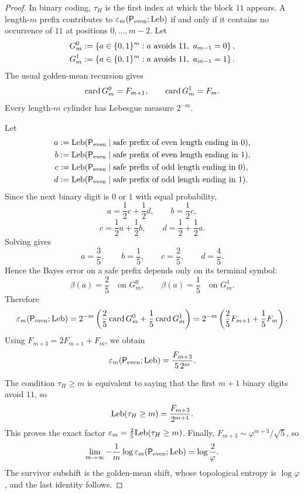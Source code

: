 \begin{proof}
In binary coding, \(\tau_H\) is the first index at which the block
\(11\) appears.  A length-\(m\) prefix contributes to
\(\varepsilon_m(\mathsf{P}_{\mathrm{even}};\mathrm{Leb})\) if and only if it
contains no occurrence of \(11\) at positions \(0,\ldots,m-2\).  Let
\begin{align*}
  G_m^0
  &:= \left\{a\in\{0,1\}^m:
           a \text{ avoids }11,\ a_{m-1}=0\right\}, \\
  G_m^1
  &:= \left\{a\in\{0,1\}^m:
           a \text{ avoids }11,\ a_{m-1}=1\right\}.
\end{align*}
The usual golden-mean recursion gives
\[
  \operatorname{card}{G_m^0}=F_{m+1},
  \qquad
  \operatorname{card}{G_m^1}=F_m.
\]
Every length-\(m\) cylinder has Lebesgue measure \(2^{-m}\).

Let
\begin{align*}
  a
  &:= \mathrm{Leb}(\mathsf{P}_{\mathrm{even}}
           \mid \text{safe prefix of even length ending in }0), \\
  b
  &:= \mathrm{Leb}(\mathsf{P}_{\mathrm{even}}
           \mid \text{safe prefix of even length ending in }1), \\
  c
  &:= \mathrm{Leb}(\mathsf{P}_{\mathrm{even}}
           \mid \text{safe prefix of odd length ending in }0), \\
  d
  &:= \mathrm{Leb}(\mathsf{P}_{\mathrm{even}}
           \mid \text{safe prefix of odd length ending in }1).
\end{align*}
Since the next binary digit is \(0\) or \(1\) with equal probability,
\[
  a=\frac12 c+\frac12 d,
  \qquad
  b=\frac12 c,
\]
\[
  c=\frac12 a+\frac12 b,
  \qquad
  d=\frac12+\frac12 a.
\]
Solving gives
\[
  a=\frac35,\qquad b=\frac15,\qquad c=\frac25,\qquad d=\frac45.
\]
Hence the Bayes error on a safe prefix depends only on its terminal
symbol:
\[
  \beta(a)=\frac25
  \quad\text{on }G_m^0,
  \qquad
  \beta(a)=\frac15
  \quad\text{on }G_m^1.
\]
Therefore
\[
  \varepsilon_m(\mathsf{P}_{\mathrm{even}};\mathrm{Leb})
  = 2^{-m}\left(
      \frac25\operatorname{card}{G_m^0}
      + \frac15\operatorname{card}{G_m^1}
    \right)
  = 2^{-m}\left(
      \frac25F_{m+1}
      + \frac15F_m
    \right).
\]
Using \(F_{m+3}=2F_{m+1}+F_m\), we obtain
\[
  \varepsilon_m(\mathsf{P}_{\mathrm{even}};\mathrm{Leb})
  = \frac{F_{m+3}}{5\,2^m}.
\]

The condition \(\tau_H\geq m\) is equivalent to saying that the first
\(m+1\) binary digits avoid \(11\), so
\[
  \mathrm{Leb}(\tau_H\geq m)=\frac{F_{m+3}}{2^{m+1}}.
\]
This proves the exact factor \(\varepsilon_m=\frac25\mathrm{Leb}(\tau_H\geq m)\).
Finally, \(F_{m+3}\sim \varphi^{m+3}/\sqrt5\), so
\[
  \lim_{m\to\infty}
  -\frac1m\log\varepsilon_m(\mathsf{P}_{\mathrm{even}};\mathrm{Leb})
  = \log\frac{2}{\varphi}.
\]
The survivor subshift is the golden-mean shift, whose topological
entropy is \(\log\varphi\), and the last identity follows.
\end{proof}

